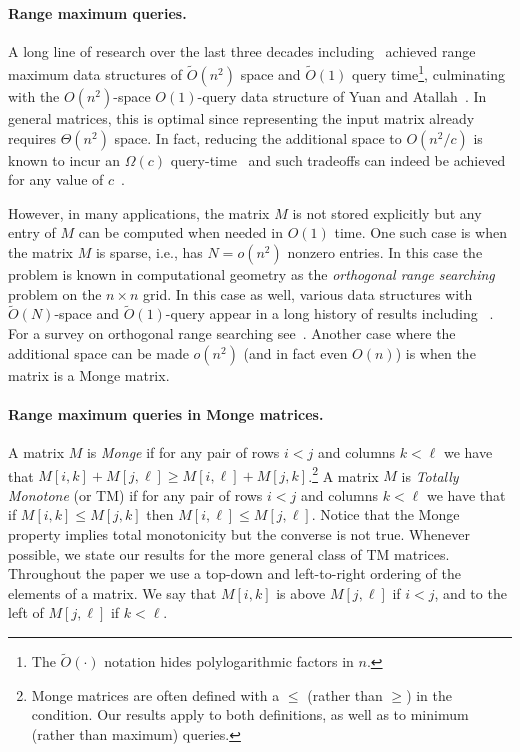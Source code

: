 \documentclass{llncs}
\begin{document}
\paragraph{\bf Range maximum queries.}
A long line of research over the last three decades including~\cite{AFL07,CR1989,DemaineLandauWeimann,GBT84,YuanA10} achieved range maximum data structures of $\tilde O(n^2)$ space and $\tilde O(1)$ query time\footnote{The $\tilde O(\cdot)$ notation
  hides polylogarithmic factors in $n$.}, culminating with the $O(n^2)$-space  $O(1)$-query data structure of Yuan and Atallah~\cite{YuanA10}. In general matrices, this is optimal since representing the input matrix already
requires $\Theta(n^2)$ space. In fact, reducing the additional space to $O(n^2/c)$ is known to incur an $ \Omega(c)$ query-time~\cite{BrodalDR10} and such tradeoffs can indeed be achieved for any value of $c$~\cite{BrodalESA,BrodalDR10}. 

However, in many applications, the matrix $M$ is not stored explicitly
but any entry of $M$ can be computed when needed in $O(1)$ time. One
such case is when the matrix $M$ is sparse, i.e.,  has 
 $N = o(n^2)$ nonzero entries. In this case 
the problem is known in computational geometry as the {\em orthogonal range searching} problem  on the $n \times n$ grid. In this case as well, various data structures with $\tilde O(N)$-space and $\tilde O(1)$-query appear in a long history of results including
~\cite{AlstrupEtAl,Patrascu,Chazelle88,Munro,GBT84}. 
For a survey on orthogonal range searching see~\cite{Nekrich}. 
Another case where the additional space can be made $o(n^2)$ (and in fact even $O(n)$) is when the matrix is a Monge matrix.

\paragraph{\bf  Range maximum queries in Monge matrices.}
A matrix $M$ is {\em Monge} if for any pair of rows $i<j$ and columns
$k<\ell$ we have that $M[i,k]+ M[j,\ell] \ge M[i,\ell]+
M[j,k]$.\footnote{Monge matrices are often defined with a $\le$
  (rather than $\ge$) in the condition. Our results apply to both
  definitions, as well as to minimum (rather than maximum) queries.}
 A matrix $M$ is {\em Totally Monotone} (or TM) if for any pair of
 rows $i<j$ and columns $k<\ell$ we have that if $M[i,k]\le M[j,k]$
 then $M[i,\ell] \le M[j,\ell]$.  Notice that the Monge property
 implies total monotonicity but the converse is not true. Whenever
 possible, we state our results for the more general class of TM
 matrices. Throughout the paper we use a top-down and left-to-right ordering of the
 elements of a matrix. We say that $M[i,k]$ is above $M[j,\ell]$ if
 $i<j$, and to the left  of $M[j,\ell]$ if $k<\ell$.
 
\end{document}
